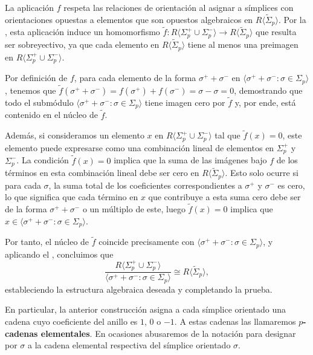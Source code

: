 La aplicación \(f\) respeta las relaciones de orientación al asignar a símplices
con orientaciones opuestas a elementos que son opuestos algebraicos en
\(R \langle \tilde{\Sigma}_{p} \rangle\). Por la ,
esta aplicación induce un homomorfismo \(\tilde{f}: R\langle \Sigma_{p}^{+} \cup \Sigma
_{p}^{-} \rangle \to R \langle \tilde{\Sigma}_{p} \rangle\) que resulta ser sobreyectivo,
ya que cada elemento en \(R \langle \tilde{\Sigma}_{p} \rangle\) tiene al menos
una preimagen en \(R\langle \Sigma_{p}^{+} \cup \Sigma_{p}^{-} \rangle\).

Por definición de \(f\), para cada elemento de la forma \(\sigma^{+} + \sigma^{-}\) en
\(\langle \sigma^{+} + \sigma^{-} : \sigma \in \Sigma_{p} \rangle\), tenemos que
\(\tilde{f}(\sigma^{+} + \sigma^{-}) = f(\sigma^{+}) + f(\sigma^{-}) = \sigma - \sigma
= 0\), demostrando que todo el submódulo \(\langle \sigma^{+} + \sigma^{-} : \sigma
\in \Sigma_{p} \rangle\) tiene imagen cero por \(\tilde{f}\) y, por ende, está contenido
en el núcleo de \(\tilde{f}\).

Además, si consideramos un elemento \(x\) en
\(R\langle \Sigma_{p}^{+} \cup \Sigma_{p}^{-} \rangle\) tal que \(\tilde{f}(x) = 0\),
este elemento puede expresarse como una combinación lineal de elementos en \(\Sigma
_{p}^{+}\) y \(\Sigma_{p}^{-}\). La condición \(\tilde{f}(x) = 0\) implica que la
suma de las imágenes bajo \(f\) de los términos en esta combinación lineal debe
ser cero en \(R \langle \tilde{\Sigma}_{p} \rangle\). Esto solo ocurre si para cada
\(\sigma\), la suma total de los coeficientes correspondientes a \(\sigma^{+}\) y
\(\sigma^{-}\) es cero, lo que significa que cada término en \(x\) que contribuye a esta
suma cero debe ser de la forma \(\sigma^{+} + \sigma^{-}\) o un múltiplo de este,
luego \(\tilde{f}(x) = 0\) implica que
\(x \in \langle \sigma^{+} + \sigma^{-} : \sigma \in \Sigma_{p} \rangle\).

Por tanto, el núcleo de \(\tilde{f}\) coincide precisamente con \(\langle \sigma^{+}
+ \sigma^{-} : \sigma \in \Sigma_{p} \rangle\), y aplicando el ,
concluimos que
\[
	\frac{R\langle \Sigma_{p}^{+} \cup \Sigma_{p}^{-} \rangle}{\langle \sigma^{+} +
	\sigma^{-} : \sigma \in \Sigma_{p} \rangle}\cong R \langle \tilde{\Sigma}_{p} \rangle
	,
\]
estableciendo la estructura algebraica deseada y completando la prueba.

\begin{observacion}
	En particular, la anterior construcción asigna a cada símplice orientado una
	cadena cuyo coeficiente del anillo es \(1\), \(0\) o \(-1\). A estas cadenas las
	llamaremos \textbf{\(p\)-cadenas elementales}. En ocasiones abusaremos de la
	notación para designar por \(\sigma\) a la cadena elemental respectiva del
	símplice orientado \(\sigma\).
\end{observacion}

